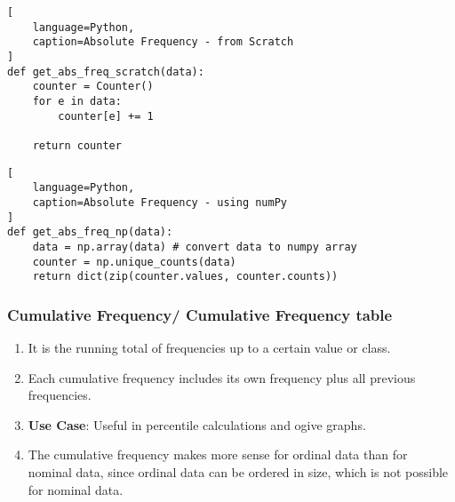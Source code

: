 \begin{lstlisting}[
    language=Python, 
    caption=Absolute Frequency - from Scratch
]
def get_abs_freq_scratch(data):
    counter = Counter()
    for e in data:
        counter[e] += 1
    
    return counter
\end{lstlisting}

\begin{lstlisting}[
    language=Python, 
    caption=Absolute Frequency - using numPy
]
def get_abs_freq_np(data):
    data = np.array(data) # convert data to numpy array
    counter = np.unique_counts(data)
    return dict(zip(counter.values, counter.counts))
\end{lstlisting}

\subsubsection{Cumulative Frequency/ Cumulative Frequency table \cite{statistics/book/Statistics-for-Data-Scientists/Maurits-Kaptein}}\label{Data/Describing Data/Frequency or Frequency table/Cumulative}

\begin{enumerate}
    \item It is the running total of frequencies up to a certain value or class. \hfill \cite{common/online/chatgpt}

    \item Each cumulative frequency includes its own frequency plus all previous frequencies. \hfill \cite{common/online/chatgpt}

    \item \textbf{Use Case}: Useful in percentile calculations and ogive graphs. \hfill \cite{common/online/chatgpt}

    \item The cumulative frequency makes more sense for ordinal data than for nominal data, since ordinal data can be ordered in size, which is not possible for nominal data. \hfill \cite{statistics/book/Statistics-for-Data-Scientists/Maurits-Kaptein}
\end{enumerate}

